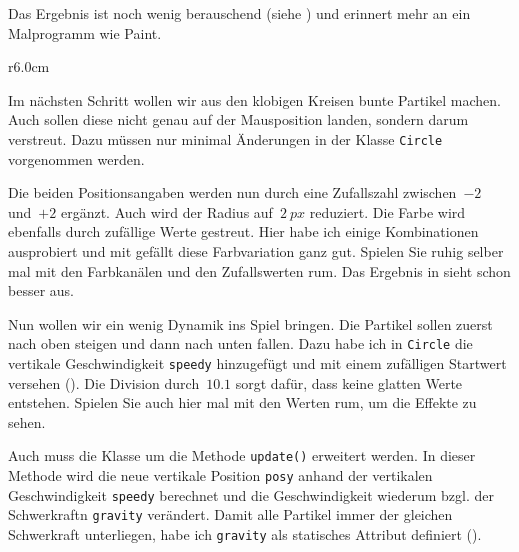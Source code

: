 Das Ergebnis ist noch wenig berauschend (siehe ) und erinnert mehr an ein Malprogramm wie Paint.


\begin{wrapfigure}[10]{r}{6.0cm}%
	\begin{center}%
		\vspace{-1cm}%
	\end{center}%
\end{wrapfigure}%
Im nächsten Schritt wollen wir aus den klobigen Kreisen bunte Partikel machen. Auch sollen diese nicht genau auf der Mausposition landen, sondern darum verstreut. Dazu müssen nur minimal Änderungen in der Klasse \texttt{Circle} vorgenommen werden.

Die beiden Positionsangaben werden nun durch eine Zufallszahl zwischen~$-2$ und~$+2$ ergänzt. Auch wird der Radius auf~$2~px$ reduziert. Die Farbe wird ebenfalls durch zufällige Werte gestreut. Hier habe ich einige Kombinationen ausprobiert und mit gefällt diese Farbvariation ganz gut. Spielen Sie ruhig selber mal mit den Farbkanälen und den Zufallswerten rum. Das Ergebnis in  sieht schon besser aus. 


Nun wollen wir ein wenig Dynamik ins Spiel bringen. Die Partikel sollen zuerst nach oben steigen und dann nach unten fallen. Dazu habe ich in \texttt{Circle} die vertikale Geschwindigkeit \texttt{speedy} hinzugefügt und mit einem zufälligen Startwert versehen (). Die Division durch~$10.1$ sorgt dafür, dass keine glatten Werte entstehen. Spielen Sie auch hier mal mit den Werten rum, um die Effekte zu sehen.

Auch muss die Klasse um die Methode \texttt{update()} erweitert werden. In dieser Methode wird die neue vertikale Position \texttt{posy} anhand der vertikalen Geschwindigkeit \texttt{speedy} berechnet und die Geschwindigkeit wiederum bzgl. der Schwerkraftn \texttt{gravity} verändert. Damit alle Partikel immer der gleichen Schwerkraft unterliegen, habe ich \texttt{gravity} als statisches Attribut definiert ().

